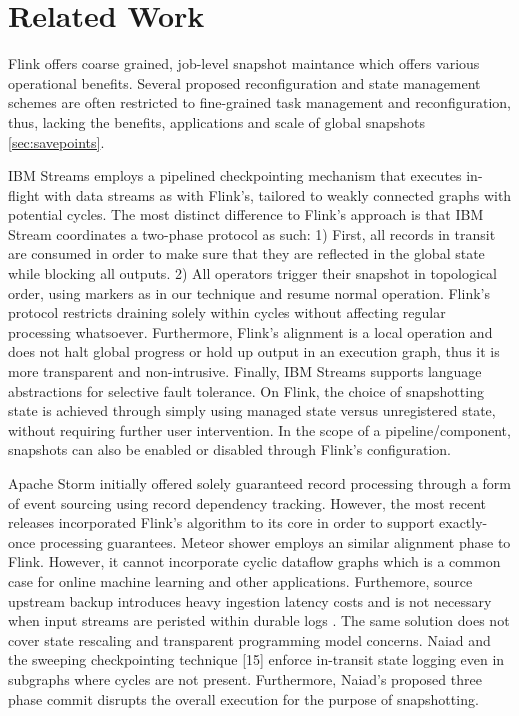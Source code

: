 
\section{Related Work}
\label{sec:related}

 Flink offers coarse grained, job-level snapshot maintance which offers various operational benefits. Several proposed reconfiguration and state management schemes \cite{castro2013integrating} are often restricted to fine-grained task management and reconfiguration, thus, lacking the benefits, applications and scale of global snapshots \autoref{sec:savepoints}.

IBM Streams employs a pipelined checkpointing mechanism \cite{jacques2016consistent} that executes in-flight with data streams as with Flink's, tailored to weakly connected graphs with potential cycles. The most distinct difference to Flink's approach is that IBM Stream coordinates a two-phase protocol as such: 1) First, all records in transit are consumed in order to make sure that they are reflected in the global state while blocking all outputs. 2) All operators trigger their snapshot in topological order, using markers as in our technique and resume normal operation. Flink's protocol restricts draining solely within cycles without affecting regular processing whatsoever. Furthermore, Flink's alignment is a local operation and does not halt global progress or hold up output in an execution graph, thus it is more transparent and non-intrusive. Finally, IBM Streams supports language abstractions for selective fault tolerance. On Flink, the choice of snapshotting state is achieved through simply using managed state versus unregistered state, without requiring further user intervention. In the scope of a pipeline/component, snapshots can also be enabled or disabled through Flink's configuration. 

Apache Storm \cite{CUSTOM:web/Storm} initially offered solely guaranteed record processing through a form of event sourcing using record dependency tracking. However, the most recent releases incorporated Flink's algorithm to its core \cite{CUSTOM:web/stormsux} in order to support exactly-once processing guarantees. Meteor shower \cite{wang2012meteor} employs an similar alignment phase to Flink. However, it cannot incorporate cyclic dataflow graphs which is a common case for online machine learning \cite{de2015samoa} and other applications. Furthemore, source upstream backup introduces heavy ingestion latency costs and is not necessary when input streams are peristed within durable logs \cite{kreps2011kafka}. The same solution does not cover state rescaling and transparent programming model concerns. Naiad \cite{murray2013naiad} and the sweeping checkpointing technique [15] enforce in-transit state logging even in subgraphs where cycles are not present. Furthermore, Naiad's proposed three phase commit disrupts the overall execution for the purpose of snapshotting. 

